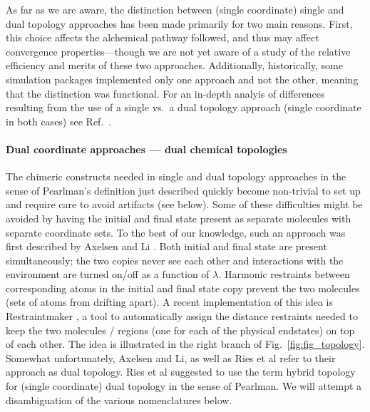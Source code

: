 \documentclass[9pt,bestpractices]{livecoms}
\newcommand{\sbnote}[1]{%
  {\bfseries{}[SB: }%
  {\textcolor{blue}{#1}}{\bfseries{}]}
}
\begin{document}
As far as we are aware, the distinction between (single coordinate) single and dual topology approaches has been made primarily for two main reasons. First, this choice affects the alchemical pathway followed, and thus may affect convergence properties---though we are not yet aware of a study of the relative efficiency and merits of these two approaches. Additionally, historically, some simulation packages implemented only one approach and not the other, meaning that the distinction was functional. For an in-depth analyis of differences resulting from the use of a  single vs.\ a dual topology approach (single coordinate in both cases) see Ref.~\cite{Boresch_2002}.

\paragraph{Dual coordinate approaches --- dual chemical topologies}

The chimeric constructs needed in single and dual topology approaches in the sense of Pearlman’s definition just described quickly become non-trivial to set up and require care to avoid artifacts (see below). %
Some of these difficulties might be avoided by having the initial and final state present as separate molecules with separate coordinate sets. To the best of our knowledge, such an approach was first described by Axelsen and Li \cite{Axelsen_1998}. Both initial and final state are present simultaneously; the two copies never see each other and interactions with the environment are turned on/off as a function of $\lambda$. Harmonic restraints between corresponding atoms in the initial and final state copy prevent the two molecules (sets of atoms from drifting apart). %
A recent implementation of this idea is Restraintmaker \cite{Ries_2022}, a tool to automatically assign the distance restraints needed to keep the two molecules / regions (one for each of the physical endstates) on top of each other. The idea is illustrated in the right branch of Fig.~\ref{fig:fig_topology}.  Somewhat unfortunately, Axelsen and Li, as well as Ries et al refer to their approach as dual topology. Ries et al suggested to use the term hybrid topology for (single coordinate) dual topology in the sense of Pearlman. We will attempt a disambiguation of the various nomenclatures below.
\end{document}
